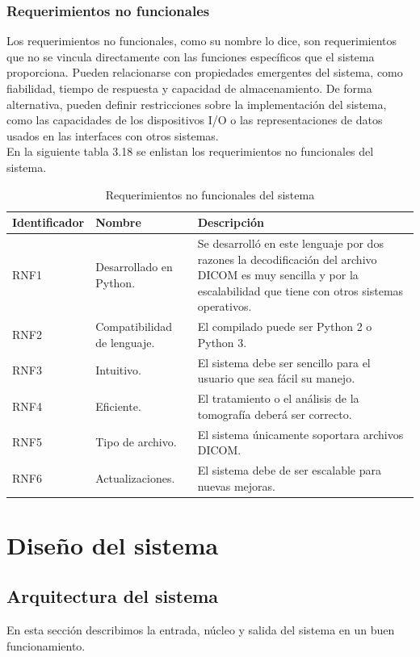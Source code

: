\documentclass[12pt]{report}
\begin{document}
\subsection{Requerimientos no funcionales}
Los requerimientos no funcionales, como su nombre lo dice, son requerimientos que no se vincula directamente con las funciones específicos que el sistema proporciona. Pueden relacionarse con propiedades emergentes del sistema, como fiabilidad, tiempo de respuesta y capacidad de almacenamiento. De forma alternativa, pueden definir restricciones sobre la implementación del sistema, como las capacidades de los dispositivos I/O o las representaciones de datos
usados en las interfaces con otros sistemas. \cite{isRF} \\

En la siguiente tabla 3.18 se enlistan los requerimientos no funcionales del sistema.

\begin{table}[H]
\begin{center}
\begin{tabular}{|p{23mm}|p{35mm}|p{75mm}|}
\hline
 Identificador & Nombre & Descripción \\
\hline \hline 
RNF1 & Desarrollado en Python. & Se desarrolló en este lenguaje por dos razones la decodificación del archivo DICOM es muy sencilla y por la escalabilidad que tiene con otros sistemas operativos.\\
\hline
RNF2 & Compatibilidad de lenguaje. & El compilado puede ser Python 2 o Python 3.\\
\hline
RNF3 & Intuitivo. & El sistema debe ser sencillo para el usuario que sea fácil su manejo.\\
\hline
RNF4 & Eficiente. & El tratamiento o el análisis de la tomografía deberá ser correcto.\\
\hline
RNF5 & Tipo de archivo. & El sistema únicamente soportara archivos DICOM.\\
\hline
RNF6 & Actualizaciones. & El sistema debe de ser escalable para nuevas mejoras.\\
\hline
\end{tabular}
\caption{Requerimientos no funcionales del sistema}
\end{center}
\end{table}

\chapter{Diseño del sistema}
\section{Arquitectura del sistema}
En esta sección describimos la entrada, núcleo y salida del sistema en un buen funcionamiento. \\
\end{document}
